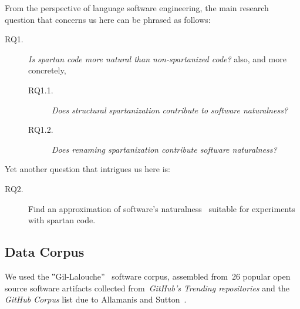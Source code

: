 From the perspective of language software engineering, the main research
question that concerns us here can be phrased as follows:
\begin{description}
  \item[RQ1.] \emph{Is spartan code more natural than non-spartanized code?} also,
        and more concretely,
        \begin{description}
          \item[RQ1.1.] \emph{Does structural spartanization contribute to software naturalness?}
          \item[RQ1.2.] \emph{Does renaming spartanization contribute software naturalness?}
        \end{description}
\end{description}
Yet another question that intrigues us here is:
\begin{description}
  \item[RQ2.] Find an approximation of software's
        naturalness~\cite{Hindle:Bar:Su:Gabel:Devanbu:12} suitable
        for experiments with spartan code.
\end{description}

\subsection{Data Corpus}
We used the ‟Gil-Lalouche”~\cite{Gil:Lalouche:16} software corpus,
assembled from~26 popular \Java open source software artifacts collected
from~\emph{GitHub's Trending
  repositories} and
the \emph{GitHub \Java Corpus}%
list due to Allamanis and Sutton~\cite{Allamanis:Sutton:13}.

